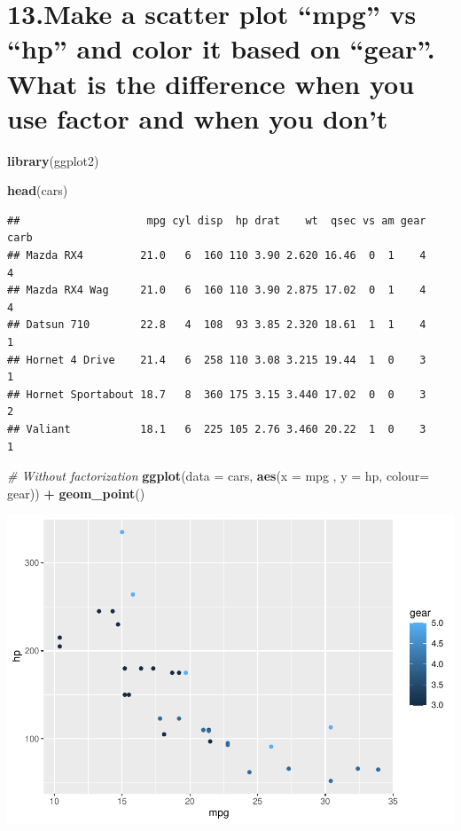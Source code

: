 \documentclass[]{article}
\newenvironment{Shaded}{\begin{snugshade}}{\end{snugshade}}
\newcommand{\CommentTok}[1]{\textcolor[rgb]{0.56,0.35,0.01}{\textit{#1}}}
\newcommand{\DataTypeTok}[1]{\textcolor[rgb]{0.13,0.29,0.53}{#1}}
\newcommand{\KeywordTok}[1]{\textcolor[rgb]{0.13,0.29,0.53}{\textbf{#1}}}
\newcommand{\NormalTok}[1]{#1}
\newcommand{\OperatorTok}[1]{\textcolor[rgb]{0.81,0.36,0.00}{\textbf{#1}}}
\newcommand{\StringTok}[1]{\textcolor[rgb]{0.31,0.60,0.02}{#1}}
\begin{document}
\hypertarget{make-a-scatter-plot-mpg-vs-hp-and-color-it-based-on-gear.-what-is-the-difference-when-you-use-factor-and-when-you-dont}{%
\section{13.Make a scatter plot ``mpg'' vs ``hp'' and color it based on
``gear''. What is the difference when you use factor and when you
don't}\label{make-a-scatter-plot-mpg-vs-hp-and-color-it-based-on-gear.-what-is-the-difference-when-you-use-factor-and-when-you-dont}}

\begin{Shaded}
\begin{Highlighting}[]
\KeywordTok{library}\NormalTok{(ggplot2)}

\KeywordTok{head}\NormalTok{(cars)}
\end{Highlighting}
\end{Shaded}

\begin{verbatim}
##                    mpg cyl disp  hp drat    wt  qsec vs am gear carb
## Mazda RX4         21.0   6  160 110 3.90 2.620 16.46  0  1    4    4
## Mazda RX4 Wag     21.0   6  160 110 3.90 2.875 17.02  0  1    4    4
## Datsun 710        22.8   4  108  93 3.85 2.320 18.61  1  1    4    1
## Hornet 4 Drive    21.4   6  258 110 3.08 3.215 19.44  1  0    3    1
## Hornet Sportabout 18.7   8  360 175 3.15 3.440 17.02  0  0    3    2
## Valiant           18.1   6  225 105 2.76 3.460 20.22  1  0    3    1
\end{verbatim}

\begin{Shaded}
\begin{Highlighting}[]
\CommentTok{# Without factorization}
\KeywordTok{ggplot}\NormalTok{(}\DataTypeTok{data =}\NormalTok{ cars, }\KeywordTok{aes}\NormalTok{(}\DataTypeTok{x =}\NormalTok{ mpg , }\DataTypeTok{y =}\NormalTok{ hp, }\DataTypeTok{colour=}\NormalTok{ gear)) }\OperatorTok{+}\StringTok{ }
\StringTok{          }\KeywordTok{geom_point}\NormalTok{()}
\end{Highlighting}
\end{Shaded}

\includegraphics{Day_5_files/figure-latex/unnamed-chunk-14-1.pdf}
\end{document}
